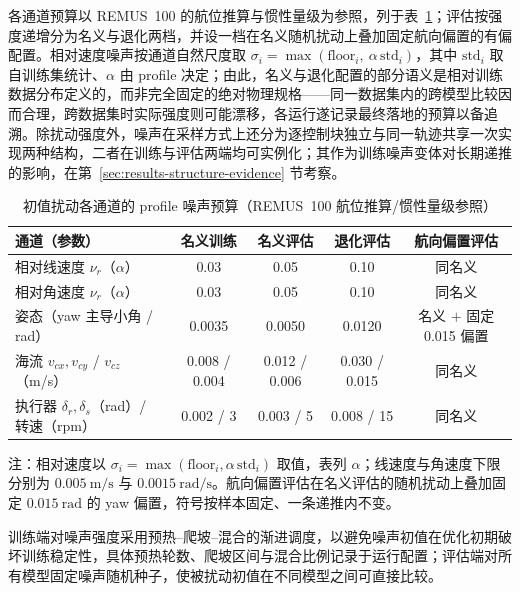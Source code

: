 各通道预算以 REMUS~100 的航位推算与惯性量级为参照，列于表~\ref{tab:noise-budget}；评估按强度递增分为名义与退化两档，并设一档在名义随机扰动上叠加固定航向偏置的有偏配置。相对速度噪声按通道自然尺度取 \(\sigma_i=\max(\text{floor}_i,\ \alpha\,\mathrm{std}_i)\)，其中 \(\mathrm{std}_i\) 取自训练集统计、\(\alpha\) 由 profile 决定；由此，名义与退化配置的部分语义是相对训练数据分布定义的，而非完全固定的绝对物理规格——同一数据集内的跨模型比较因而合理，跨数据集时实际强度则可能漂移，各运行遂记录最终落地的预算以备追溯。除扰动强度外，噪声在采样方式上还分为逐控制块独立与同一轨迹共享一次实现两种结构，二者在训练与评估两端均可实例化；其作为训练噪声变体对长期递推的影响，在第~\ref{sec:results-structure-evidence} 节考察。

\begin{table}[htbp]
  \centering
  \caption{初值扰动各通道的 profile 噪声预算（REMUS~100 航位推算/惯性量级参照）}
  \label{tab:noise-budget}
  \small
  \begin{tabularx}{\textwidth}{>{\raggedright\arraybackslash}X cccc}
    \toprule
    通道（参数） & 名义训练 & 名义评估 & 退化评估 & 航向偏置评估 \\
    \midrule
    相对线速度 \(\nu_r\)（\(\alpha\)）& 0.03 & 0.05 & 0.10 & 同名义 \\
    相对角速度 \(\nu_r\)（\(\alpha\)）& 0.03 & 0.05 & 0.10 & 同名义 \\
    姿态（yaw 主导小角 / rad）& 0.0035 & 0.0050 & 0.0120 & 名义 \(+\) 固定 0.015 偏置 \\
    海流 \(v_{cx},v_{cy}\) / \(v_{cz}\)（m/s）& 0.008 / 0.004 & 0.012 / 0.006 & 0.030 / 0.015 & 同名义 \\
    执行器 \(\delta_r,\delta_s\)（rad）/ 转速（rpm）& 0.002 / 3 & 0.003 / 5 & 0.008 / 15 & 同名义 \\
    \bottomrule
  \end{tabularx}
  \par\vspace{2pt}
  \footnotesize 注：相对速度以 \(\sigma_i=\max(\text{floor}_i,\alpha\,\mathrm{std}_i)\) 取值，表列 \(\alpha\)；线速度与角速度下限分别为 \(0.005~\mathrm{m/s}\) 与 \(0.0015~\mathrm{rad/s}\)。航向偏置评估在名义评估的随机扰动上叠加固定 \(0.015~\mathrm{rad}\) 的 yaw 偏置，符号按样本固定、一条递推内不变。
\end{table}

训练端对噪声强度采用预热--爬坡--混合的渐进调度，以避免噪声初值在优化初期破坏训练稳定性，具体预热轮数、爬坡区间与混合比例记录于运行配置；评估端对所有模型固定噪声随机种子，使被扰动初值在不同模型之间可直接比较。
